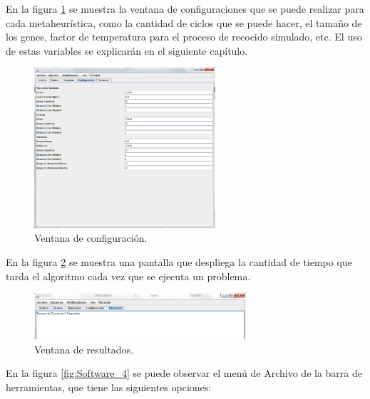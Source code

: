 \hspace*{1cm}En la figura \ref {fig:Software_9} se muestra la ventana de configuraciones que se puede realizar para cada metaheurística, como la cantidad de ciclos que se puede hacer, el tamaño de los genes, factor de temperatura para el proceso de recocido simulado, etc. El uso de estas variables se explicarán en el siguiente capítulo.\\
     \begin{figure}[hbtp]
        \centering
            \includegraphics[width=0.6\textwidth]{Software/Imagenes/Software_9.png}
            \caption{Ventana de configuración.}
            \label{fig:Software_9}
    \end{figure}
    
\hspace*{1cm}En la figura \ref {fig:Software_10} se muestra una pantalla que despliega la cantidad de tiempo que tarda el algoritmo cada vez que se ejecuta un problema.\\
     \begin{figure}[hbtp]
        \centering
            \includegraphics[width=0.7\textwidth]{Software/Imagenes/Software_10.png}
            \caption{Ventana de resultados.}
            \label{fig:Software_10}
    \end{figure}
    
\hspace*{1cm}En la figura \ref {fig:Software_4} se puede observar el menú de Archivo de la barra de herramientas, que tiene las siguientes opciones:

